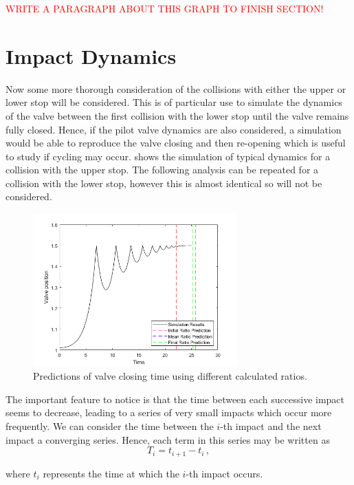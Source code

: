 \textcolor{Red}{WRITE A PARAGRAPH ABOUT THIS GRAPH TO FINISH SECTION!}

\newpage
\section{Impact Dynamics} \label{sec: ImpactDynamics}

Now some more thorough consideration of the collisions with either the upper or lower stop will be considered. This is of particular use to simulate the dynamics of the valve between the first collision with the lower stop until the valve remains fully closed. Hence, if the pilot valve dynamics are also considered, a simulation would be able to reproduce the valve closing and then re-opening which is useful to study if cycling may occur.  shows the simulation of typical dynamics for a collision with the upper stop. The following analysis can be repeated for a collision with the lower stop, however this is almost identical so will not be considered.
~
\begin{figure}[ht]
    \centering
    \includegraphics[width=0.7\textwidth]{Figures/ImpactSeries/PositionTime.png}
    \caption{Predictions of valve closing time using different calculated ratios.}
    \label{fig: ImpactPos}
\end{figure}

The important feature to notice is that the time between each successive impact seems to decrease, leading to a series of very small impacts which occur more frequently. We can consider the time between the $i$-th impact and the next impact a converging series. Hence, each term in this series may be written as
~
\begin{equation*}
    T_i = t_{i+1} - t_{i} \, ,
\end{equation*}

where $t_i$ represents the time at which the $i$-th impact occurs.

